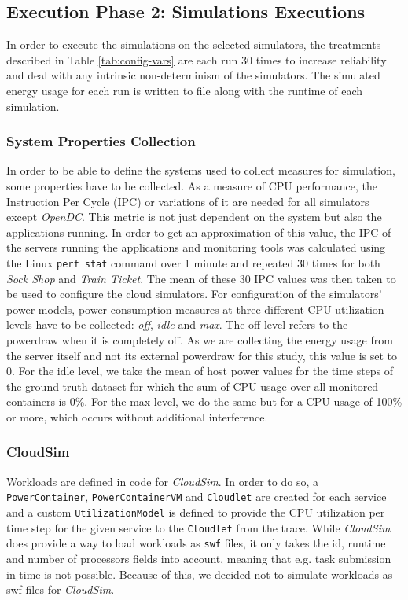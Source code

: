 \subsection{Execution Phase 2: Simulations Executions} \label{sec:simTestingExecution}
In order to execute the simulations on the selected simulators, the treatments described in Table \ref{tab:config-vars} are each run 30 times to increase reliability and deal with any intrinsic non-determinism of the simulators. The simulated energy usage for each run is written to file along with the runtime of each simulation.

\subsubsection{System Properties Collection}
In order to be able to define the systems used to collect measures for simulation, some properties have to be collected. As a measure of CPU performance, the Instruction Per Cycle (IPC) or variations of it are needed for all simulators except \textit{OpenDC}. This metric is not just dependent on the system but also the applications running. In order to get an approximation of this value, the IPC of the servers running the applications and monitoring tools was calculated using the Linux \verb|perf stat| command over 1 minute and repeated 30 times for both \textit{Sock Shop} and \textit{Train Ticket}. The mean of these 30 IPC values was then taken to be used to configure the cloud simulators. For configuration of the simulators' power models, power consumption measures at three different CPU utilization levels have to be collected: \textit{off}, \textit{idle} and \textit{max}. The off level refers to the powerdraw when it is completely off. As we are collecting the energy usage from the server itself and not its external powerdraw for this study, this value is set to 0. For the idle level, we take the mean of host power values for the time steps of the ground truth dataset for which the sum of CPU usage over all monitored containers is 0\%. For the max level, we do the same but for a CPU usage of 100\% or more, which occurs without additional interference.

\subsubsection{CloudSim}
Workloads are defined in code for \textit{CloudSim}. In order to do so, a \verb|PowerContainer|, \verb|PowerContainerVM| and \verb|Cloudlet| are created for each service and a custom \verb|UtilizationModel| is defined to provide the CPU utilization per time step for the given service to the \verb|Cloudlet| from the trace. While \textit{CloudSim} does provide a way to load workloads as \texttt{swf} files, it only takes the id, runtime and number of processors fields into account, meaning that e.g. task submission in time is not possible. Because of this, we decided not to simulate workloads as swf files for \textit{CloudSim}.

